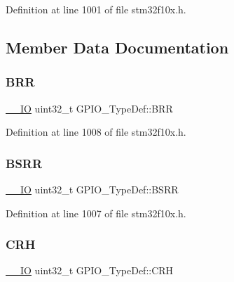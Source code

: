 Definition at line 1001 of file stm32f10x.\+h.



\subsection{Member Data Documentation}
\mbox{\label{struct_g_p_i_o___type_def_aab918bfbfae459789db1fd0b220c7f21}} 
\subsubsection{\texorpdfstring{B\+RR}{BRR}}
{\footnotesize\ttfamily \hyperlink{core__sc300_8h_aec43007d9998a0a0e01faede4133d6be}{\+\_\+\+\_\+\+IO} uint32\+\_\+t G\+P\+I\+O\+\_\+\+Type\+Def\+::\+B\+RR}



Definition at line 1008 of file stm32f10x.\+h.

\mbox{\label{struct_g_p_i_o___type_def_acd6f21e08912b484c030ca8b18e11cd6}} 
\subsubsection{\texorpdfstring{B\+S\+RR}{BSRR}}
{\footnotesize\ttfamily \hyperlink{core__sc300_8h_aec43007d9998a0a0e01faede4133d6be}{\+\_\+\+\_\+\+IO} uint32\+\_\+t G\+P\+I\+O\+\_\+\+Type\+Def\+::\+B\+S\+RR}



Definition at line 1007 of file stm32f10x.\+h.

\mbox{\label{struct_g_p_i_o___type_def_afe53502a3dbf9e7dcf9ac83f67ac481d}} 
\subsubsection{\texorpdfstring{C\+RH}{CRH}}
{\footnotesize\ttfamily \hyperlink{core__sc300_8h_aec43007d9998a0a0e01faede4133d6be}{\+\_\+\+\_\+\+IO} uint32\+\_\+t G\+P\+I\+O\+\_\+\+Type\+Def\+::\+C\+RH}



